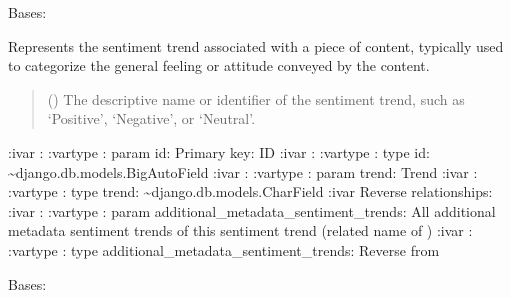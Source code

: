 \documentclass[letterpaper,10pt,english]{sphinxmanual}
\begin{document}
\begin{fulllineitems}
\label{\detokenize{source/meta_models_management:meta_models_management.models.SentimentTrend}}
\pysigstartsignatures
{}
\pysigstopsignatures
\sphinxAtStartPar
Bases: 

\sphinxAtStartPar
Represents the sentiment trend associated with a piece of content, typically used to categorize the general feeling or attitude conveyed by the content.
\begin{quote}\begin{description}
\sphinxAtStartPar
{} () \textendash{} The descriptive name or identifier of the sentiment trend, such as ‘Positive’, ‘Negative’, or ‘Neutral’.

\end{description}\end{quote}

\sphinxAtStartPar
:ivar : 
:vartype : param id: Primary key: ID
:ivar : 
:vartype : type id: \textasciitilde{}django.db.models.BigAutoField
:ivar : 
:vartype : param trend: Trend
:ivar :
:vartype : type trend: \textasciitilde{}django.db.models.CharField
:ivar Reverse relationships:
:ivar : 
:vartype : param additional\_metadata\_sentiment\_trends: All additional metadata sentiment trends of this sentiment trend (related name of )
:ivar : 
:vartype : type additional\_metadata\_sentiment\_trends: Reverse  from {\hyperref[\detokenize{source/meta_models_management:meta_models_management.models.AdditionalMetadata}]{}}

\begin{fulllineitems}
\label{\detokenize{source/meta_models_management:meta_models_management.models.SentimentTrend.DoesNotExist}}
\pysigstartsignatures
{}
\pysigstopsignatures
\sphinxAtStartPar
Bases: 


\end{fulllineitems}
\end{fulllineitems}
\end{document}
